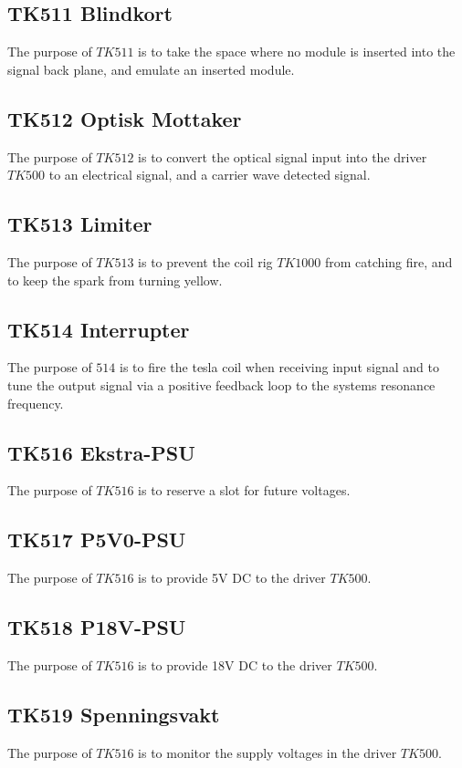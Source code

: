 \subsection*{TK511 Blindkort}
The purpose of $TK511$ is to take the space where no module is inserted into the signal back plane, and emulate an inserted module.

\subsection*{TK512 Optisk Mottaker}
The purpose of $TK512$ is to convert the optical signal input into the driver $TK500$ to an electrical signal, and a carrier wave detected signal.

\subsection*{TK513 Limiter}
The purpose of $TK513$ is to prevent the coil rig $TK1000$ from catching fire, and to keep the spark from turning yellow.

\subsection*{TK514 Interrupter}
The purpose of $514$ is to fire the tesla coil when receiving input signal and to tune the output signal via a positive feedback loop to the systems resonance frequency.

\subsection*{TK516 Ekstra-PSU}
The purpose of $TK516$ is to reserve a slot for future voltages.

\subsection*{TK517 P5V0-PSU}
The purpose of $TK516$ is to provide 5V DC to the driver $TK500$.

\subsection*{TK518 P18V-PSU}
The purpose of $TK516$ is to provide 18V DC to the driver $TK500$.

\subsection*{TK519 Spenningsvakt}
The purpose of $TK516$ is to monitor the supply voltages in the driver $TK500$.

